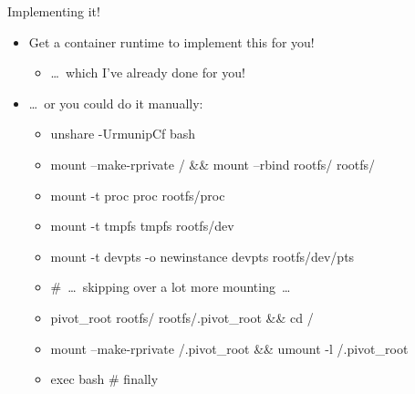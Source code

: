 \documentclass[10pt,aspectratio=169]{beamer}
\begin{document}
	\begin{frame}{Implementing it!}
		\begin{itemize}
			\item Get a container runtime to implement this for you!
			\begin{itemize}
				\item<2-> \dots~which I've already done for you!
			\end{itemize}
			\item<2-> \dots~or you could do it manually:
			\begin{itemize}
				\tt
				\item<3-> {unshare -UrmunipCf bash}
				\item<3-> {mount --make-rprivate / \&\& mount --rbind rootfs/ rootfs/}
				\item<3-> {mount -t proc proc rootfs/proc}
				\item<3-> {mount -t tmpfs tmpfs rootfs/dev}
				\item<3-> {mount -t devpts -o newinstance devpts rootfs/dev/pts}
				\item<3-> {\#~\dots~skipping over a lot more mounting~\dots}
				\item<3-> {pivot\_root rootfs/ rootfs/.pivot\_root \&\& cd /}
				\item<3-> {mount --make-rprivate /.pivot\_root \&\& umount -l /.pivot\_root}
				\item<3-> {exec bash \# finally}
			\end{itemize}
		\end{itemize}
	\end{frame}
\end{document}
